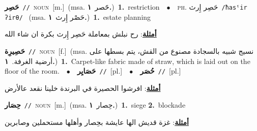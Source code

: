 \documentclass[10pt,a4paper,twoside]{article} %
\begin{document}
\begin{multicols}{2}
{\setlength\topsep{0pt}\textbf{\foreignlanguage{arabic}{حَصِر}}\ {\color{gray}\texttt{//}\color{black}}\ \textsc{noun}\ [m.]\ \color{gray}(msa. \foreignlanguage{arabic}{حََصر}~\foreignlanguage{arabic}{\textbf{١.}})\color{black}\ \textbf{1.}~restriction\ \ $\bullet$\ \ \textsc{ph.} \color{gray} \foreignlanguage{arabic}{حَصِر إِرث}\color{black}\ {\color{gray}\texttt{/{\sffamily ħasˤir ʔirθ}/}\color{black}}\ \color{gray} (msa. \foreignlanguage{arabic}{حَصْر إِرث}~\foreignlanguage{arabic}{\textbf{١.}})\color{black}\ \textbf{1.}~estate planning\  \begin{flushright}\color{gray}\foreignlanguage{arabic}{\textbf{\underline{\foreignlanguage{arabic}{أمثلة}}}: رح نبلش بمعاملة حَصِر إِرث بكرة ان شاء الله}\end{flushright}\color{black}} \vspace{2mm}

{\setlength\topsep{0pt}\textbf{\foreignlanguage{arabic}{حَصِيرِة}}\ {\color{gray}\texttt{//}\color{black}}\ \textsc{noun}\ [f.]\ \color{gray}(msa. \foreignlanguage{arabic}{نسيج شبيه بالسجادة مصنوع من القش، يتم بسطها على أرضية الغرفة.}~\foreignlanguage{arabic}{\textbf{١.}})\color{black}\ \textbf{1.}~Carpet-like fabric made of straw, which is laid out on the floor of the room.\ \ $\bullet$\ \ \setlength\topsep{0pt}\textbf{\foreignlanguage{arabic}{حَصَايِر}}\ {\color{gray}\texttt{//}\color{black}}\ [pl.]\ \ $\bullet$\ \ \setlength\topsep{0pt}\textbf{\foreignlanguage{arabic}{حُصَر}}\ {\color{gray}\texttt{//}\color{black}}\ [pl.]\  \begin{flushright}\color{gray}\foreignlanguage{arabic}{\textbf{\underline{\foreignlanguage{arabic}{أمثلة}}}: افرشوا الحصيرة في البرندة خلينا نقعد عالأرض}\end{flushright}\color{black}} \vspace{2mm}

{\setlength\topsep{0pt}\textbf{\foreignlanguage{arabic}{حِصَار}}\ {\color{gray}\texttt{//}\color{black}}\ \textsc{noun}\ [m.]\ \color{gray}(msa. \foreignlanguage{arabic}{حِصار}~\foreignlanguage{arabic}{\textbf{١.}})\color{black}\ \textbf{1.}~siege  \textbf{2.}~blockade\  \begin{flushright}\color{gray}\foreignlanguage{arabic}{\textbf{\underline{\foreignlanguage{arabic}{أمثلة}}}: غزة قديش الها عايشة بحِصار وأهلها مستحملين وصابرين}\end{flushright}\color{black}} \vspace{2mm}


\end{multicols}
\end{document}
